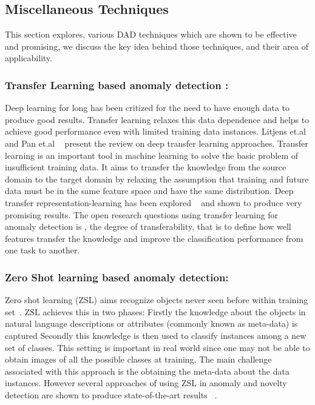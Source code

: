 \subsection{Miscellaneous Techniques}
This section explores, various DAD techniques which are shown to be effective and promising,  we discuss the key idea behind those techniques, and their area of applicability.

\subsubsection{Transfer Learning based anomaly detection : }
Deep learning for long has been critized for the need to have enough data to produce good results.
Transfer learning relaxes this data dependence and helps to  achieve good performance even with limited  training data instances. Litjens et.al and Pan et.al ~\cite{litjens2017survey,pan2010survey} present the review on deep transfer learning approaches. Transfer learning is an important tool in machine learning to solve the basic problem of insufficient training data. It aims to transfer the knowledge from the source domain to the target domain by relaxing the assumption that  training and future data must be in the same feature space and have the same distribution. Deep transfer representation-learning has been explored ~\cite{andrews2016transfer,vercruyssen2017transfer,li2012detecting,almajai2012anomaly,kumar2017transfer,liang2018transfer} and shown to produce very promising results. The open research questions using transfer learning for anomaly detection is , the degree of  transferability, that is to define how well features transfer the knowledge and improve the classification performance from one task to another.

\subsubsection{Zero Shot learning based anomaly detection:}
Zero shot learning (ZSL)  aims recognize objects never seen before within training set~\cite{romera2015embarrassingly}.
ZSL achieves this  in two phases: Firstly the  knowledge about the objects in natural language descriptions or attributes (commonly known as meta-data) is captured Secondly this knowledge is then used to classify instances among a new set of classes. This setting is important in real world since one may not be able to obtain images of all the possible classes at training. The main challenge associated with this approach is the obtaining the meta-data about the data instances. However several approaches of using ZSL in anomaly and novelty detection are shown to produce state-of-the-art results ~\cite{mishra2017generative,socher2013zero,xian2017zero,liu2017generalized,rivero2017grassmannian}.

